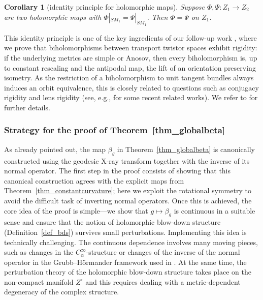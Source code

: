 \documentclass[10pt,a4paper]{amsart}
\numberwithin{equation}{section}
\newtheorem{Corollary}[Theorem]{Corollary}
\theoremstyle{definition}
\newcommand{\1}{{\bf 1}}
\begin{document}
\begin{Corollary}[identity principle for holomorphic maps]\label{cor_maps}
Suppose $\Phi,\Psi\colon Z_1\rightarrow Z_2$ are two holomorphic maps with $\Phi|_{SM_1}=\Psi|_{SM_1}$. Then $\Phi=\Psi$ on $Z_1$.
\end{Corollary}

This identity principle is one of the key ingredients of our follow-up work \cite{BMP24b}, where we prove that biholomorphisms between transport twistor spaces exhibit rigidity: if the underlying metrics are simple or Anosov, then every biholomorphism is, up to constant rescaling and the antipodal map, the lift of an orientation preserving isometry. As the restriction of a biholomorphism to unit tangent bundles always induces an orbit equivalence,
this is closely related to questions such as conjugacy rigidity and lens rigidity (see, e.g., \cite{CGL23,GoRo23,GLP25,GM18} for some recent related works). We refer to \cite{BMP24b} for further details.

\subsubsection[Strategy for the proof of Theorem 1.3]{Strategy for the proof of Theorem~\ref{thm_globalbeta}}
As already pointed out, the map $\beta_g$ in Theorem~\ref{thm_globalbeta} is canonically constructed using the geodesic X-ray transform together with the inverse of its normal operator. The first step in the proof consists of showing that this canonical construction agrees with the explicit maps from Theorem~\ref{thm_constantcurvature}; here we exploit the rotational symmetry to avoid the difficult task of inverting normal operators. Once this is achieved, the core idea of the proof is simple---we show that
$g\mapsto \beta_g$ is continuous in a suitable sense and ensure that the notion of holomorphic blow-down structure (Definition~\ref{def_bds}) survives small perturbations. Implementing this idea is technically challenging. The continuous dependence involves many moving pieces, such as changes in the $C_\alpha^\infty$-structure or changes of the inverse of the normal operator in the Grubb--H{\"o}rmander framework used in \cite{MNP19a}. At the same time, the perturbation theory of the holomorphic blow-down structure takes place on the non-compact manifold $Z^\circ$ and this requires dealing with a metric-dependent degeneracy of the complex structure.
\end{document}
